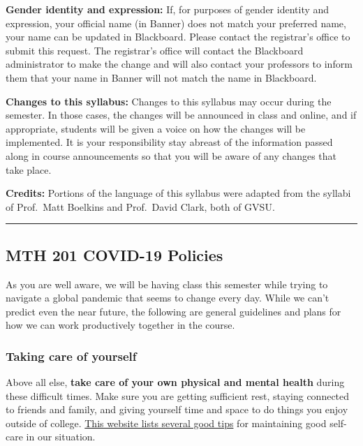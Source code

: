 \documentclass[]{article}
\begin{document}
\textbf{Gender identity and expression:} If, for purposes of gender
identity and expression, your official name (in Banner) does not match
your preferred name, your name can be updated in Blackboard. Please
contact the registrar's office to submit this request. The registrar's
office will contact the Blackboard administrator to make the change and
will also contact your professors to inform them that your name in
Banner will not match the name in Blackboard.

\textbf{Changes to this syllabus:} Changes to this syllabus may occur
during the semester. In those cases, the changes will be announced in
class and online, and if appropriate, students will be given a voice on
how the changes will be implemented. It is your responsibility stay
abreast of the information passed along in course announcements so that
you will be aware of any changes that take place.

\textbf{Credits:} Portions of the language of this syllabus were adapted
from the syllabi of Prof.~Matt Boelkins and Prof.~David Clark, both of
GVSU.

\begin{center}\rule{0.5\linewidth}{\linethickness}\end{center}

\hypertarget{mth-201-covid-19-policies}{%
\subsection{MTH 201 COVID-19 Policies}\label{mth-201-covid-19-policies}}

As you are well aware, we will be having class this semester while
trying to navigate a global pandemic that seems to change every day.
While we can't predict even the near future, the following are general
guidelines and plans for how we can work productively together in the
course.

\hypertarget{taking-care-of-yourself}{%
\subsubsection{Taking care of yourself}\label{taking-care-of-yourself}}

Above all else, \textbf{take care of your own physical and mental
health} during these difficult times. Make sure you are getting
sufficient rest, staying connected to friends and family, and giving
yourself time and space to do things you enjoy outside of college.
\href{https://www.mayoclinichealthsystem.org/hometown-health/speaking-of-health/self-care-tips-during-the-covid-19-pandemic}{This
website lists several good tips} for maintaining good self-care in our
situation.
\end{document}
